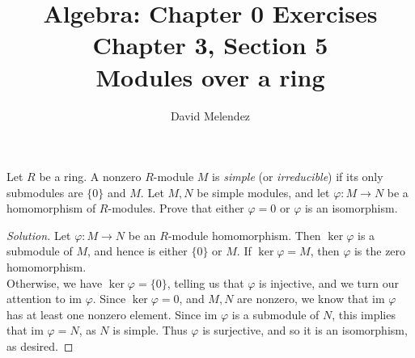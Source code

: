\documentclass[12pt]{article}
\newenvironment{problem}[2][Problem]{\begin{trivlist}
\item[\hskip \labelsep {\bfseries #1}\hskip \labelsep {\bfseries #2.}]}{\end{trivlist}}
\newcommand{\im}{\text{im }}
\newenvironment{solution}
  {\renewcommand\qedsymbol{$\blacksquare$}\begin{proof}[Solution]}
{\end{proof}}
\theoremstyle{remark}
\begin{document}
\title{Algebra: Chapter 0 Exercises\\ \large Chapter 3, Section 5\\ 
\large Modules over a ring}
\author{David Melendez}
\maketitle

\begin{problem}{5.4}
  Let $R$ be a ring.
  A nonzero $R$-module $M$ is \textit{simple} (or \textit{irreducible})
  if its only submodules are $\{0\}$ and $M$.
  Let $M,N$ be simple modules, and let $\varphi:M\to N$ be a homomorphism
  of $R$-modules.
  Prove that either $\varphi=0$ or $\varphi$ is an isomorphism.
\end{problem}
\begin{solution}
  Let $\varphi:M\to N$ be an $R$-module homomorphism. 
  Then $\ker\varphi$ is a submodule of $M$, and hence is either $\{0\}$
  or $M$. 
  If $\ker\varphi=M$, then $\varphi$ is the zero homomorphism.\\
  \indent Otherwise, we have $\ker\varphi=\{0\}$, telling us that $\varphi$
  is injective, and we turn our attention
  to $\im\varphi$.
  Since $\ker\varphi=0$, and $M,N$ are nonzero, we know that $\im\varphi$
  has at least one nonzero element.
  Since $\im\varphi$ is a submodule of $N$, this implies that $\im\varphi=N$,
  as $N$ is simple.
  Thus $\varphi$ is surjective, and so it is an isomorphism, as desired.

\end{solution}<++>
\end{document}
